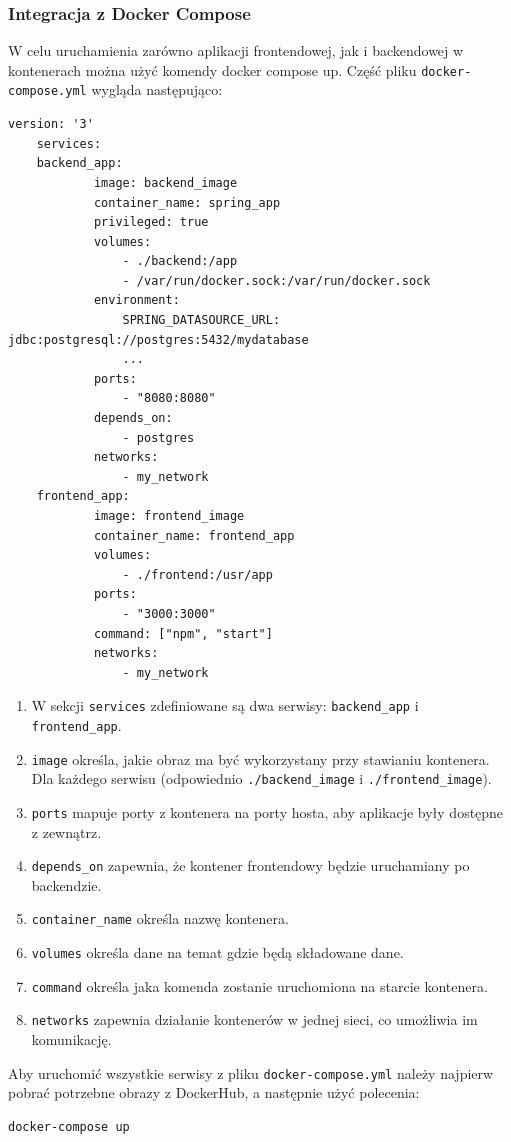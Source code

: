 \subsubsection{Integracja z Docker Compose}
W celu uruchamienia zarówno aplikacji frontendowej, jak i backendowej w kontenerach można użyć komendy docker compose up. Część pliku \texttt{docker-compose.yml} wygląda następująco:
\begin{lstlisting}[tabsize=2,basicstyle=\footnotesize\ttfamily]
version: '3'
	services:
    backend_app:
			image: backend_image
			container_name: spring_app
			privileged: true
			volumes:
				- ./backend:/app
				- /var/run/docker.sock:/var/run/docker.sock
			environment:
				SPRING_DATASOURCE_URL: jdbc:postgresql://postgres:5432/mydatabase
				...
			ports:
				- "8080:8080"
			depends_on:
				- postgres
			networks:
				- my_network
    frontend_app:
			image: frontend_image
			container_name: frontend_app
			volumes:
				- ./frontend:/usr/app
			ports:
				- "3000:3000"
			command: ["npm", "start"]
			networks:
				- my_network
\end{lstlisting}
\begin{enumerate}[labelwidth=1em]
    \item W sekcji \texttt{services} zdefiniowane są dwa serwisy: \texttt{backend\_app} i \texttt{frontend\_app}.
    \item \texttt{image} określa, jakie obraz ma być wykorzystany przy stawianiu kontenera. Dla każdego serwisu (odpowiednio \texttt{./backend\_image} i \texttt{./frontend\_image}).
    \item \texttt{ports} mapuje porty z kontenera na porty hosta, aby aplikacje były dostępne z zewnątrz.
    \item \texttt{depends\_on} zapewnia, że kontener frontendowy będzie uruchamiany po backendzie.
		\item \texttt{container\_name} określa nazwę kontenera.
		\item \texttt{volumes} określa dane na temat gdzie będą składowane dane.
		\item \texttt{command} określa jaka komenda zostanie uruchomiona na starcie kontenera.
		\item \texttt{networks} zapewnia działanie kontenerów w jednej sieci, co umożliwia im komunikację.
\end{enumerate}

Aby uruchomić wszystkie serwisy z pliku \texttt{docker-compose.yml} należy najpierw pobrać potrzebne obrazy z DockerHub, a następnie użyć polecenia:
\begin{lstlisting}[basicstyle=\footnotesize\ttfamily]
docker-compose up
\end{lstlisting}

